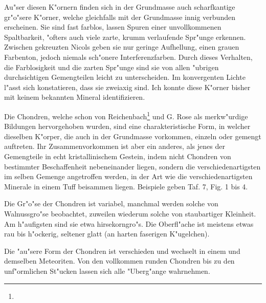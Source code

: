 \documentclass[a4paper, 11pt, oneside, polutonikogreek, german]{article}
\begin{document}
Au"ser diesen K"ornern finden sich in der Grundmasse auch scharfkantige gr"o"sere K"orner, welche gleichfalls mit der Grundmasse innig verbunden erscheinen. Sie sind fast farblos, lassen Spuren einer unvollkommenen Spaltbarkeit, "ofters auch viele zarte, krumm verlaufende Spr"unge erkennen. Zwischen gekreuzten Nicols geben sie nur geringe Aufhellung, einen grauen Farbenton, jedoch niemals sch"onere Interferenzfarben. Durch dieses Verhalten, die Farblosigkeit und die zarten Spr"unge sind sie von allen "ubrigen durchsichtigen Gemengteilen leicht zu unterscheiden. Im konvergenten Lichte l"asst sich konstatieren, dass sie zweiaxig sind. Ich konnte diese K"orner bisher mit keinem bekannten Mineral identifizieren.

Die Chondren, welche schon von Reichenbach\footnote{} und G. Rose als merkw"urdige Bildungen hervorgehoben wurden, sind eine charakteristische Form, in welcher dieselben K"orper, die auch in der Grundmasse vorkommen, einzeln oder gemengt auftreten. Ihr Zusammenvorkommen ist aber ein anderes, als jenes der Gemengteile in echt kristallinischem Gestein, indem nicht Chondren von bestimmter Beschaffenheit nebeneinander liegen, sondern die verschiedenartigsten im selben Gemenge angetroffen werden, in der Art wie die verschiedenartigsten Minerale in einem Tuff beisammen liegen. Beispiele geben Taf. 7, Fig. 1 bis 4.

Die Gr"o"se der Chondren ist variabel, manchmal werden solche von Walnussgro"se beobachtet, zuweilen wiederum solche von staubartiger Kleinheit. Am h"aufigsten sind sie etwa hirsekorngro"s. Die Oberfl"ache ist meistens etwas rau bis h"ockerig, seltener glatt (an harten faserigen K"ugelchen).

Die "au"sere Form der Chondren ist verschieden und wechselt in einem und demselben Meteoriten. Von den vollkommen runden Chondren bis zu den unf"ormlichen St"ucken lassen sich alle "Uberg"ange wahrnehmen.
\end{document}
